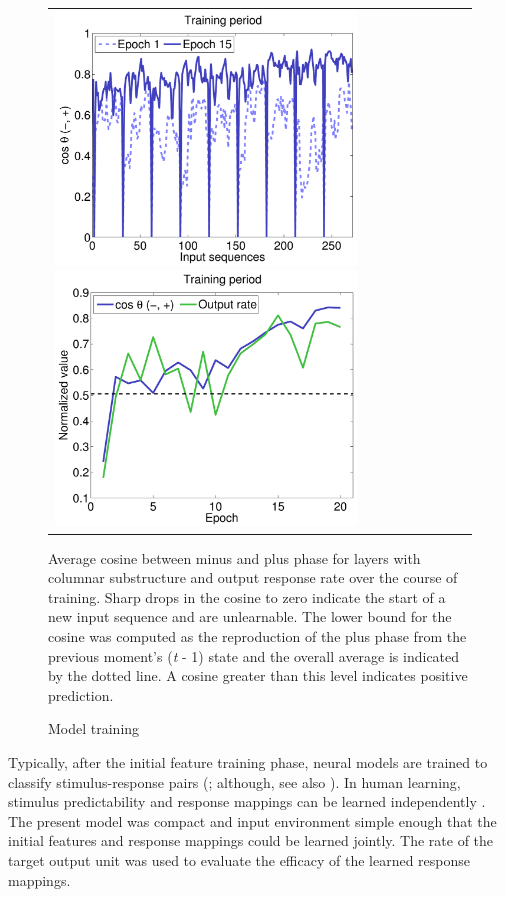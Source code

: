 \documentclass[dwyatte_dissertation.tex]{subfiles}
\begin{document}
\begin{figure}[h!]
\begin{center}
\begin{tabular}{ll}
\includegraphics[width=80mm]{figs/chap_sims/sims_cos_out_trl.pdf}
\includegraphics[width=80mm]{figs/chap_sims/sims_cos_out_epc.pdf}
\end{tabular}
\end{center}
\caption{Model training}{Average cosine between minus and plus phase for layers with columnar substructure and output response rate over the course of training. Sharp drops in the cosine to zero indicate the start of a new input sequence and are unlearnable. The lower bound for the cosine was computed as the reproduction of the plus phase from the previous moment's (\textit{t} - 1) state and the overall average is indicated by the dotted line. A cosine greater than this level indicates positive prediction.}
\label{fig:sims_train}
\end{figure}

Typically, after the initial feature training phase, neural models are trained to classify stimulus-response pairs (; although, see also ). In human learning, stimulus predictability and response mappings can be learned independently \cite{WyartNobreSummerfield12,KokRahnevJeheeEtAl12}. The present model was compact and input environment simple enough that the initial features and response mappings could be learned jointly. The rate of the target output unit was used to evaluate the efficacy of the learned response mappings. 
\end{document}
